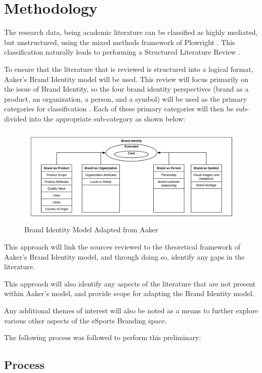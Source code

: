 \documentclass[10pt,twoside]{article}
\begin{document}
\section{Methodology}

The research data, being academic literature can be classified as highly mediated, but unstructured, using the mixed methods framework of Plowright \cite{plowright2011using}. This classification naturally leads to performing a Structured Literature Review \cite{petticrew2008systematic}.

To ensure that the literature that is reviewed is structured into a logical format, Aaker's Brand Identity model will be used. This review will focus primarily on the issue of Brand Identity, so the four brand identity perspectives (brand as a product, an organization, a person, and a symbol) will be used as the primary categories for classification \cite{aaker2012brand}. Each of these primary categories will then be sub-divided into the appropriate sub-category as shown below:

\begin{figure}[h]
\caption{Brand Identity Model Adapted from Aaker}
\centering
\includegraphics[width=1\textwidth]{BrandIdentityModel.png}
\end{figure}

This approach will link the sources reviewed to the theoretical framework of Aaker's Brand Identity model, and through doing so, identify any gaps in the literature.

This approach will also identify any aspects of the literature that are not present within Aaker's model, and provide scope for adapting the Brand Identity model.

Any additional themes of interest will also be noted as a means to further explore various other aspects of the eSports Branding space.

The following process was followed to perform this preliminary:
\subsection{Process}
\end{document}
